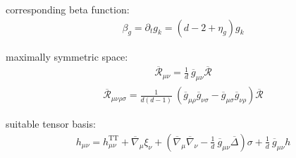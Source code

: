 corresponding beta function:
\begin{align}
	\beta_g = \partial_t g_k = \left(d-2 + \eta_g\right)g_k
\end{align}

maximally symmetric space:
\begin{align}
	\overline{\mathcal{R}}_{\mu\nu} = \frac{1}{d} \ \overline{g}_{\mu\nu} \overline{\mathcal{R}}
\end{align}
\begin{align}
	\overline{\mathcal{R}}_{\mu\nu\rho\sigma} = \frac{1}{d(d-1)} \ (\overline{g}_{\mu\rho}\overline{g}_{\nu\sigma} - \overline{g}_{\mu\sigma}\overline{g}_{\nu\rho}) \overline{\mathcal{R}}
\end{align}

suitable tensor basis:
\begin{align}
	h_{\mu\nu} = h_{\mu\nu}^{\text{TT}} + \overline{\nabla}_{\mu}\xi_{\nu} + \left(\overline{\nabla}_{\mu}\overline{\nabla}_{\nu} - \frac{1}{d} \ \overline{g}_{\mu\nu}\overline{\Delta}\right)\sigma + \frac{1}{d} \ \overline{g}_{\mu\nu}h
\end{align}